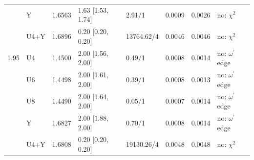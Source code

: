 \documentclass[10pt,a4paper]{article}
\begin{document}
{\begin{longtable}{@{}llllllll@{}}
 & Y & 1.6563 & 1.63 [1.53, 1.74] & 2.91/1 & 0.0009 & 0.0026 & no: $\chi^2$ \\
 & U4+Y & 1.6896 & 0.20 [0.20, 0.20] & 13764.62/4 & 0.0046 & 0.0046 & no: $\chi^2$ \\
1.95 & U4 & 1.4500 & 2.00 [1.56, 2.00] & 0.49/1 & 0.0008 & 0.0014 & no: $\omega^\prime$ edge \\
 & U6 & 1.4498 & 2.00 [1.61, 2.00] & 0.39/1 & 0.0008 & 0.0013 & no: $\omega^\prime$ edge \\
 & U8 & 1.4490 & 2.00 [1.64, 2.00] & 0.05/1 & 0.0007 & 0.0014 & no: $\omega^\prime$ edge \\
 & Y & 1.6827 & 2.00 [1.88, 2.00] & 0.70/1 & 0.0008 & 0.0014 & no: $\omega^\prime$ edge \\
 & U4+Y & 1.6808 & 0.20 [0.20, 0.20] & 19130.26/4 & 0.0048 & 0.0048 & no: $\chi^2$ \\
\bottomrule
\end{longtable}}
\end{document}
